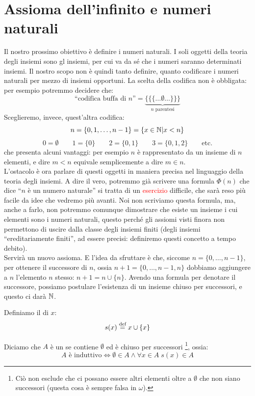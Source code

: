 \section{Assioma dell'infinito e numeri naturali}
Il nostro prossimo obiettivo è definire i numeri naturali. I soli oggetti della teoria degli insiemi sono gl insiemi, per cui va da sé che 
i numeri saranno determinati insiemi. Il nostro scopo non è quindi tanto definire, quanto codificare i numeri naturali per mezzo di insiemi opportuni.
La scelta della codifica non è obbligata: per esempio potremmo decidere che:
\[ \text{``codifica buffa di $n$''} = \underbrace{\{\{\{\ldots \emptyset\ldots\}\}\}}_{\text{$n$ parentesi}}
	\]
Sceglieremo, invece, quest'altra codifica:
\[ n = \{0,1,\ldots,n-1\} = \{x \in \mathbb N | x < n\}
	\]\[ 0 = \emptyset \qquad 1 = \{0\} \qquad 2 = \{0,1\} \qquad 3 = \{0,1,2\} \qquad \text{etc.}
		\]
che presenta alcuni vantaggi: per esempio $n$ è rappresentato da un insieme di $n$ elementi, e dire $m < n$ equivale semplicemente a dire $m \in n$.\\
L'ostacolo è ora parlare di questi oggetti in maniera precisa nel linguaggio della teoria degli insiemi. A dire il vero, potremmo già scrivere una formula $\Phi(n)$ che dice 
``$n$ è un numero naturale'' si tratta di un \textcolor{red}{esercizio} difficile, che sarà reso più facile da idee che vedremo più avanti. Noi non scriviamo questa formula, ma, anche a farlo,
non potremmo comunque dimostrare che esiste un insieme i cui elementi sono i numeri naturali, questo perché gli assiomi visti finora non permettono di uscire dalla classe degli insiemi finiti (degli insiemi ``ereditariamente finiti'',
ad essere precisi: definiremo questi concetto a tempo debito).\\
Servirà un nuovo assioma. E l'idea da sfruttare è che, siccome $n = \{0,\ldots,n-1\}$, per ottenere il successore di $n$, ossia $n+1 = \{0,\ldots,n-1,n\}$ dobbiamo aggiungere a $n$ l'elemento $n$ stesso: $n+1 = n \cup \{n\}$.
Avendo una formula per denotare il successore, possiamo postulare l'esistenza di un insieme chiuso per successori, e questo ci darà $\mathbb N$.

\begin{definition}
	[Successore]
	Definiamo il  di $x$:
	\[ s(x) \overset{\text{def}}{=} x \cup \{x\}
		\]
\end{definition}

\begin{definition}
	Diciamo che $A$ è un  se contiene $\emptyset$ ed è chiuso per successori \footnote{Ciò non esclude che ci possano essere altri elementi oltre a $\emptyset$ che non siano successori (questa cosa è sempre falsa in $\omega$).}, ossia:
	\[ \text{$A$ è induttivo} \iff \emptyset \in A \land \forall x \in A \; s(x) \in A
		\]
\end{definition}

